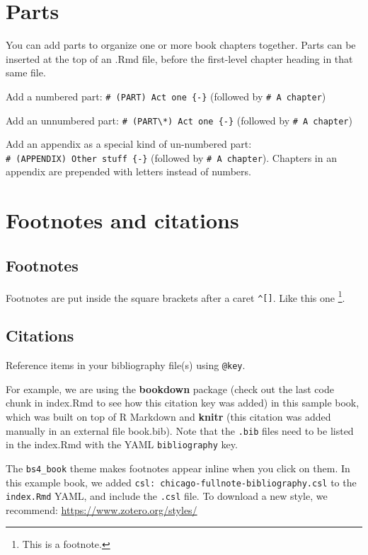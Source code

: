 \documentclass[
]{book}
\theoremstyle{definition}
\theoremstyle{definition}
\theoremstyle{definition}
\theoremstyle{definition}
\theoremstyle{remark}
\begin{document}
\hypertarget{parts}{%
\section{Parts}\label{parts}}

You can add parts to organize one or more book chapters together. Parts can be inserted at the top of an .Rmd file, before the first-level chapter heading in that same file.

Add a numbered part: \texttt{\#\ (PART)\ Act\ one\ \{-\}} (followed by \texttt{\#\ A\ chapter})

Add an unnumbered part: \texttt{\#\ (PART\textbackslash{}*)\ Act\ one\ \{-\}} (followed by \texttt{\#\ A\ chapter})

Add an appendix as a special kind of un-numbered part: \texttt{\#\ (APPENDIX)\ Other\ stuff\ \{-\}} (followed by \texttt{\#\ A\ chapter}). Chapters in an appendix are prepended with letters instead of numbers.

\hypertarget{footnotes-and-citations}{%
\section{Footnotes and citations}\label{footnotes-and-citations}}

\hypertarget{footnotes}{%
\subsection{Footnotes}\label{footnotes}}

Footnotes are put inside the square brackets after a caret \texttt{\^{}{[}{]}}. Like this one \footnote{This is a footnote.}.

\hypertarget{citations}{%
\subsection{Citations}\label{citations}}

Reference items in your bibliography file(s) using \texttt{@key}.

For example, we are using the \textbf{bookdown} package \citep{R-bookdown} (check out the last code chunk in index.Rmd to see how this citation key was added) in this sample book, which was built on top of R Markdown and \textbf{knitr} \citep{xie2015} (this citation was added manually in an external file book.bib).
Note that the \texttt{.bib} files need to be listed in the index.Rmd with the YAML \texttt{bibliography} key.

The \texttt{bs4\_book} theme makes footnotes appear inline when you click on them. In this example book, we added \texttt{csl:\ chicago-fullnote-bibliography.csl} to the \texttt{index.Rmd} YAML, and include the \texttt{.csl} file. To download a new style, we recommend: \url{https://www.zotero.org/styles/}
\end{document}

